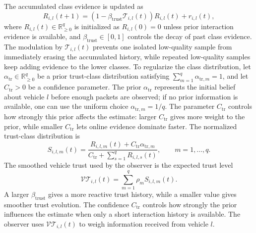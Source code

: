 \documentclass[journal,twoside]{IEEEtran}
\def\VT{\mathcal{VT}} %
\def\T{\mathcal{T}} %
\begin{document}
The accumulated class evidence is updated as
\begin{equation}
    R_{i,l}(t+1)=
    \left(1-\beta_{\text{trust}}\T_{i,l}(t)\right)R_{i,l}(t)
    +r_{i,l}(t),
    \label{eq_class_history_update}
\end{equation}
where $R_{i,l}(t)\in\mathbb{R}_{\ge0}^{q}$ is initialized as $R_{i,l}(0)=0$ unless prior interaction evidence is available, and $\beta_{\text{trust}}\in[0,1]$ controls the decay of past class evidence.
The modulation by $\T_{i,l}(t)$ prevents one isolated low-quality sample from immediately erasing the accumulated history, while repeated low-quality samples keep adding evidence to the lower classes.
To regularize the class distribution, let $\alpha_{\mathrm{tr}}\in\mathbb{R}_{\ge0}^{q}$ be a prior trust-class distribution satisfying $\sum_{m=1}^{q}\alpha_{\mathrm{tr},m}=1$, and let $C_{\mathrm{tr}}>0$ be a confidence parameter.
The prior $\alpha_{\mathrm{tr}}$ represents the initial belief about vehicle $l$ before enough packets are observed; if no prior information is available, one can use the uniform choice $\alpha_{\mathrm{tr},m}=1/q$.
The parameter $C_{\mathrm{tr}}$ controls how strongly this prior affects the estimate: larger $C_{\mathrm{tr}}$ gives more weight to the prior, while smaller $C_{\mathrm{tr}}$ lets online evidence dominate faster.
The normalized trust-class distribution is
\begin{equation}
    S_{i,l,m}(t)=
    \frac{R_{i,l,m}(t)+C_{\mathrm{tr}}\alpha_{\mathrm{tr},m}}
    {C_{\mathrm{tr}}+\sum_{s=1}^{q}R_{i,l,s}(t)},
    \qquad m=1,\ldots,q.
    \label{eq_class_distribution}
\end{equation}
The smoothed vehicle trust used by the observer is the expected trust level
\begin{equation}
    \VT_{i,l}(t)=
    \sum_{m=1}^{q}\rho_m S_{i,l,m}(t).
    \label{eq_class_filtered_vehicle_trust}
\end{equation}
A larger $\beta_{\text{trust}}$ gives a more reactive trust history, while a smaller value gives smoother trust evolution.
The confidence $C_{\mathrm{tr}}$ controls how strongly the prior influences the estimate when only a short interaction history is available.
The observer uses $\VT_{i,l}(t)$ to weigh information received from vehicle $l$.
\end{document}
